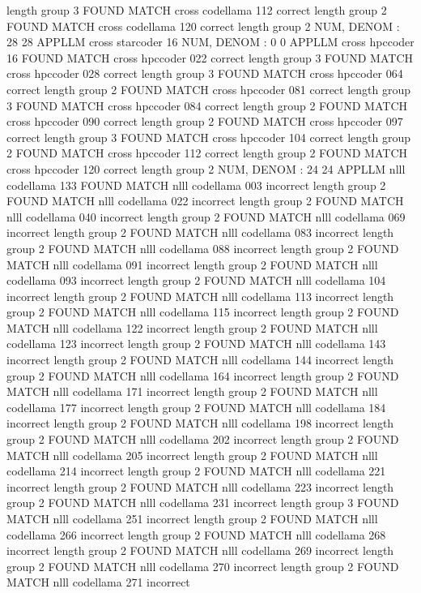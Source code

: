 length group  3
FOUND MATCH cross codellama 112 correct
length group  2
FOUND MATCH cross codellama 120 correct
length group  2
NUM, DENOM : 28 28
APPLLM cross starcoder
16
NUM, DENOM : 0 0
APPLLM cross hpccoder
16
FOUND MATCH cross hpccoder 022 correct
length group  3
FOUND MATCH cross hpccoder 028 correct
length group  3
FOUND MATCH cross hpccoder 064 correct
length group  2
FOUND MATCH cross hpccoder 081 correct
length group  3
FOUND MATCH cross hpccoder 084 correct
length group  2
FOUND MATCH cross hpccoder 090 correct
length group  2
FOUND MATCH cross hpccoder 097 correct
length group  3
FOUND MATCH cross hpccoder 104 correct
length group  2
FOUND MATCH cross hpccoder 112 correct
length group  2
FOUND MATCH cross hpccoder 120 correct
length group  2
NUM, DENOM : 24 24
APPLLM nlll codellama
133
FOUND MATCH nlll codellama 003 incorrect
length group  2
FOUND MATCH nlll codellama 022 incorrect
length group  2
FOUND MATCH nlll codellama 040 incorrect
length group  2
FOUND MATCH nlll codellama 069 incorrect
length group  2
FOUND MATCH nlll codellama 083 incorrect
length group  2
FOUND MATCH nlll codellama 088 incorrect
length group  2
FOUND MATCH nlll codellama 091 incorrect
length group  2
FOUND MATCH nlll codellama 093 incorrect
length group  2
FOUND MATCH nlll codellama 104 incorrect
length group  2
FOUND MATCH nlll codellama 113 incorrect
length group  2
FOUND MATCH nlll codellama 115 incorrect
length group  2
FOUND MATCH nlll codellama 122 incorrect
length group  2
FOUND MATCH nlll codellama 123 incorrect
length group  2
FOUND MATCH nlll codellama 143 incorrect
length group  2
FOUND MATCH nlll codellama 144 incorrect
length group  2
FOUND MATCH nlll codellama 164 incorrect
length group  2
FOUND MATCH nlll codellama 171 incorrect
length group  2
FOUND MATCH nlll codellama 177 incorrect
length group  2
FOUND MATCH nlll codellama 184 incorrect
length group  2
FOUND MATCH nlll codellama 198 incorrect
length group  2
FOUND MATCH nlll codellama 202 incorrect
length group  2
FOUND MATCH nlll codellama 205 incorrect
length group  2
FOUND MATCH nlll codellama 214 incorrect
length group  2
FOUND MATCH nlll codellama 221 incorrect
length group  2
FOUND MATCH nlll codellama 223 incorrect
length group  2
FOUND MATCH nlll codellama 231 incorrect
length group  3
FOUND MATCH nlll codellama 251 incorrect
length group  2
FOUND MATCH nlll codellama 266 incorrect
length group  2
FOUND MATCH nlll codellama 268 incorrect
length group  2
FOUND MATCH nlll codellama 269 incorrect
length group  2
FOUND MATCH nlll codellama 270 incorrect
length group  2
FOUND MATCH nlll codellama 271 incorrect
